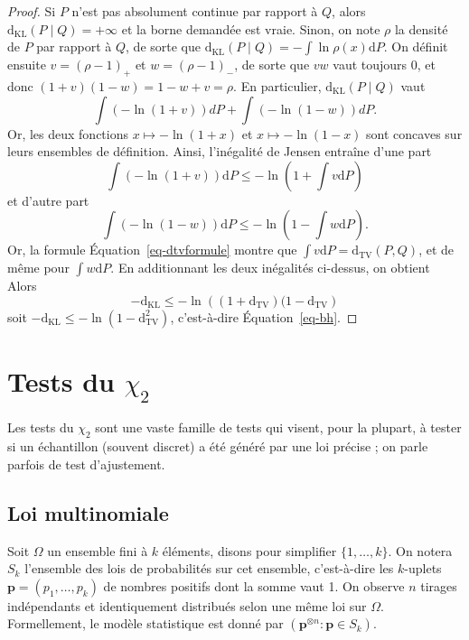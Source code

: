\documentclass[
  10,
  letterpaper,
  DIV=11,
  numbers=noendperiod]{scrreport}
\newcommand{\dkl}{\mathrm{d}_{\mathrm{KL}}}
\newcommand{\dtv}{\mathrm{d}_{\mathrm{TV}}}
\theoremstyle{plain}
\theoremstyle{definition}
\theoremstyle{plain}
\theoremstyle{definition}
\theoremstyle{definition}
\theoremstyle{plain}
\theoremstyle{remark}
\begin{document}
\begin{proof}

Si \(P\) n'est pas absolument continue par rapport à \(Q\), alors
\(\dkl(P \mid Q)=+\infty\) et la borne demandée est vraie. Sinon, on
note \(\rho\) la densité de \(P\) par rapport à \(Q\), de sorte que
\(\dkl(P\mid Q) = -\int \ln \rho(x) \mathrm{d}P\). On définit ensuite
\(v = (\rho-1)_+\) et \(w = (\rho-1)_-\), de sorte que \(vw\) vaut
toujours 0, et donc \((1 + v)(1-w) = 1 - w + v = \rho\). En particulier,
\(\dkl(P\mid Q)\) vaut \[\int(-\ln(1+v))dP + \int (-\ln(1-w))dP.\] Or,
les deux fonctions \(x\mapsto -\ln(1+x)\) et \(x\mapsto -\ln(1-x)\) sont
concaves sur leurs ensembles de définition. Ainsi, l'inégalité de Jensen
entraîne d'une part
\[ \int(-\ln(1+v))\mathrm{d}P \leqslant - \ln \left(1 + \int v \mathrm{d}P\right)\]
et d'autre part
\[ \int(-\ln(1-w))\mathrm{d}P \leqslant - \ln \left(1 - \int w \mathrm{d}P\right).\]
Or, la formule Équation~\ref{eq-dtvformule} montre que
\(\int v\mathrm{d}P = \dtv(P,Q)\), et de même pour
\(\int w \mathrm{d}P\). En additionnant les deux inégalités ci-dessus,
on obtient Alors
\[-\dkl \leqslant - \ln \left((1 + \dtv)(1 - \dtv\right)\] soit
\(-\dkl \leqslant -\ln(1 - \dtv^2)\), c'est-à-dire Équation~\ref{eq-bh}.

\end{proof}


\hypertarget{tests-du-chi_2}{%
\chapter{\texorpdfstring{Tests du
\(\chi_2\)}{Tests du \textbackslash chi\_2}}\label{tests-du-chi_2}}

\newcommand{\1}{\mathbf{1}}
\newcommand{\PP}{\mathbb{P}}
\newcommand{\E}{\mathbb{E}}
\newcommand{\bp}{\mathbf{p}}

Les tests du \(\chi_2\) sont une vaste famille de tests qui visent, pour
la plupart, à tester si un échantillon (souvent discret) a été généré
par une loi précise ; on parle parfois de test d'ajustement.

\hypertarget{loi-multinomiale}{%
\section{Loi multinomiale}\label{loi-multinomiale}}

Soit \(\Omega\) un ensemble fini à \(k\) éléments, disons pour
simplifier \(\{1, \dotsc, k\}\). On notera \(S_k\) l'ensemble des lois
de probabilités sur cet ensemble, c'est-à-dire les \(k\)-uplets
\(\mathbf{p} = (p_1, \dotsc, p_k)\) de nombres positifs dont la somme
vaut 1. On observe \(n\) tirages indépendants et identiquement
distribués selon une même loi sur \(\Omega\). Formellement, le modèle
statistique est donné par
\((\mathbf{p}^{\otimes n} : \mathbf{p} \in S_k)\).
\end{document}
